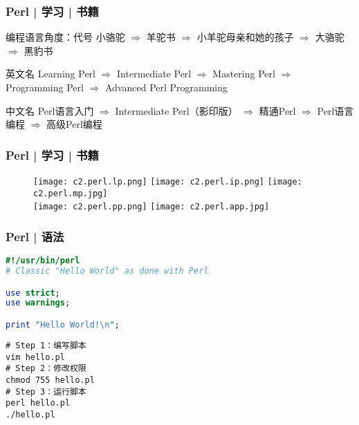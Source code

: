 \begin{frame}
  \frametitle{Perl | 学习 | 书籍}
  \begin{block}{编程语言角度：代号}
小骆驼 $\Rightarrow$ 羊驼书 $\Rightarrow$ 小羊驼母亲和她的孩子 $\Rightarrow$ 大骆驼 $\Rightarrow$ 黑豹书
  \end{block}
  \pause
  \begin{block}{英文名}
Learning Perl $\Rightarrow$ Intermediate Perl $\Rightarrow$ Mastering Perl $\Rightarrow$ Programming Perl $\Rightarrow$ Advanced Perl Programming
  \end{block}
  \pause
  \begin{block}{中文名}
Perl语言入门 $\Rightarrow$ Intermediate Perl（影印版） $\Rightarrow$ 精通Perl $\Rightarrow$ Perl语言编程 $\Rightarrow$ 高级Perl编程
  \end{block}
  \pause
\end{frame}

\begin{frame}
  \frametitle{Perl | 学习 | 书籍}
  \begin{figure}
    \centering
    \texttt{[image: c2.perl.lp.png]}
    \qquad
    \texttt{[image: c2.perl.ip.png]}
    \qquad
    \texttt{[image: c2.perl.mp.jpg]}\\
    \texttt{[image: c2.perl.pp.png]}
    \hspace{2cm}
    \texttt{[image: c2.perl.app.jpg]}
  \end{figure}
\end{frame}

\begin{frame}[fragile]
  \frametitle{Perl | \alert{语法}}
\begin{lstlisting}[language=Perl]
#!/usr/bin/perl
# Classic "Hello World" as done with Perl

use strict;
use warnings;

print "Hello World!\n";
\end{lstlisting}
\pause
\begin{lstlisting}
# Step 1：编写脚本
vim hello.pl
# Step 2：修改权限
chmod 755 hello.pl
# Step 3：运行脚本
perl hello.pl
./hello.pl
\end{lstlisting}
\end{frame}

